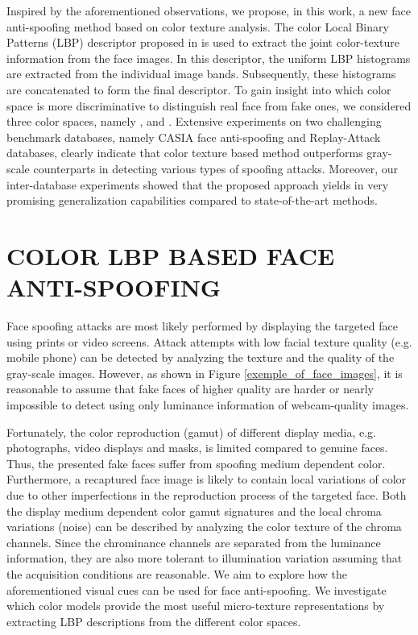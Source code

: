 \documentclass{article}
\begin{document}
Inspired by the aforementioned observations, we propose, in this work, a new face anti-spoofing method based on color texture analysis. The color Local Binary Patterns (LBP) descriptor proposed in \cite{color_lbp} is used to extract the joint color-texture information from the face images. In this descriptor, the uniform LBP histograms are extracted from the individual image bands. Subsequently, these histograms are concatenated to form the final descriptor. To gain insight into which color space is more discriminative to distinguish real face from fake ones, we considered three color spaces, namely ,  and . Extensive experiments on two challenging benchmark databases, namely CASIA face anti-spoofing and Replay-Attack databases, clearly indicate that color texture based method outperforms gray-scale counterparts in detecting various types of spoofing attacks. Moreover, our inter-database experiments showed that the proposed approach yields in very promising generalization capabilities compared to state-of-the-art methods.



\vspace{-4mm}
\section{COLOR LBP BASED FACE ANTI-SPOOFING }
	\vspace{-2mm}
\label{sec:lbp}

Face spoofing attacks are most likely performed by displaying the targeted face using prints or video screens. Attack attempts with low facial texture quality (e.g. mobile phone) can be detected by analyzing the texture and the quality of the gray-scale images. However, as shown in Figure \ref{exemple_of_face_images}, it is reasonable to assume that fake faces of higher quality are harder or nearly impossible to detect using only luminance information of webcam-quality images.

Fortunately, the color reproduction (gamut) of different display media, e.g. photographs, video displays and masks, is limited compared to genuine faces. Thus, the presented fake faces suffer from spoofing medium dependent color. Furthermore, a recaptured face image is likely to contain local variations of color due to other imperfections in the reproduction process of the targeted face. Both the display medium dependent color gamut signatures and the local chroma variations (noise) can be described by analyzing the color texture of the chroma channels. Since the chrominance channels are separated from the luminance information, they are also more tolerant to illumination variation assuming that the acquisition conditions are reasonable. We aim to explore how the aforementioned visual cues can be used for face anti-spoofing. We investigate which color models provide the most useful micro-texture representations by extracting LBP descriptions from the different color spaces.  
\end{document}
